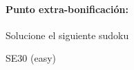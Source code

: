 \documentclass[fleqn]{article}
\begin{document}
 \paragraph*{Punto extra-bonificación:} Solucione el siguiente sudoku
 \cluefont{\Large}
 \renewcommand*{\puzzlefile}{se5.sud}
\begin{center}
\begin{minipage}{0.95\linewidth}\begin{center}
SE30 (easy) \\
\end{center}\end{minipage}
\end{center}
\end{document}

